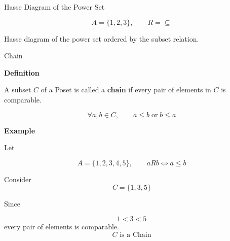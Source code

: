 \documentclass[aspectratio=169]{beamer}
\begin{document}
\begin{frame}{Hasse Diagram of the Power Set}

\[
A=\{1,2,3\},\qquad R=\subseteq
\]

\begin{center}


\end{center}

\centering
\small Hasse diagram of the power set ordered by the subset relation.

\end{frame}
\begin{frame}{Chain}

\textbf{Definition}

A subset \(C\) of a Poset is called a \textbf{chain} if every
pair of elements in \(C\) is comparable.

\[
\forall a,b\in C,\qquad
a\le b\;\text{or}\;b\le a
\]

\vspace{0.2cm}

\textbf{Example}

Let

\[
A=\{1,2,3,4,5\},\qquad aRb\iff a\le b
\]

Consider
\[
C=\{1,3,5\}
\]

Since

\[
1<3<5
\]
every pair of elements is comparable.
\[
\boxed{C\text{ is a Chain}}
\]

\end{frame}
\end{document}
